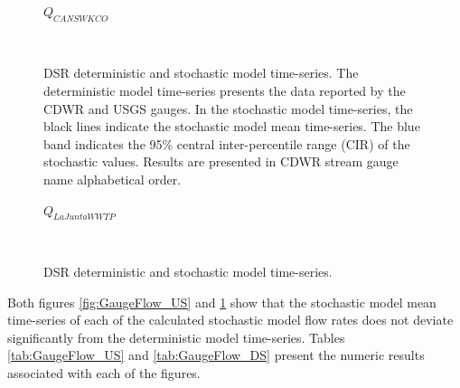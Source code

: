 \begin{linenumbers}
\subfiguretop
\begin{landscape}
	\begin{figure}
		\centering
		$ Q_{CANSWKCO} $
		\begin{subfigure}{0.7\textwidth}
			\centering
		\end{subfigure}%
		\begin{subfigure}{0.7\textwidth}
			\centering
		\end{subfigure}\\
		\caption[DSR deterministic and stochastic model time-series.]{DSR deterministic and stochastic model time-series.  The deterministic model time-series presents the data reported by the CDWR and USGS gauges.  In the stochastic model time-series, the black lines indicate the stochastic model mean time-series.  The blue band indicates the 95\% central inter-percentile range (CIR) of the stochastic values.  Results are presented in CDWR stream gauge name alphabetical order.}
		\label{fig:GaugeFlow_DS}
	\end{figure}
\end{landscape}
\subfiguremid
\begin{landscape}
	\begin{figure}
		\centering
		$ Q_{LaJuntaWWTP} $
		\begin{subfigure}{0.7\textwidth}
			\centering
		\end{subfigure}%
		\begin{subfigure}{0.7\textwidth}
			\centering
		\end{subfigure}\\
		\caption{DSR deterministic and stochastic model time-series.}
	\end{figure}
\end{landscape}

Both figures \ref{fig:GaugeFlow_US} and \ref{fig:GaugeFlow_DS} show that the stochastic model mean time-series of each of the calculated stochastic model flow rates does not deviate significantly from the deterministic model time-series.  Tables \ref{tab:GaugeFlow_US} and \ref{tab:GaugeFlow_DS} present the numeric results associated with each of the figures.


\end{linenumbers}
